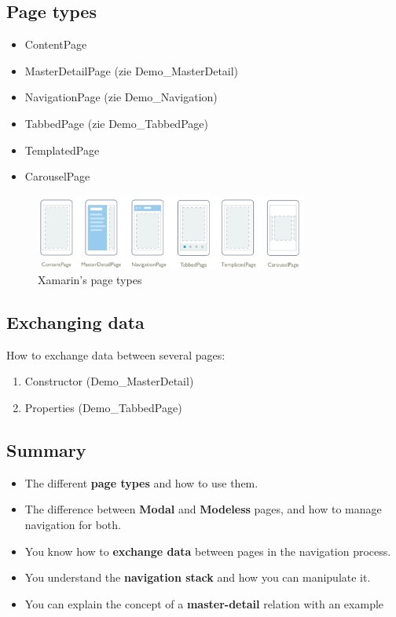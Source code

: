 \documentclass{article}
\newcommand{\bold}[1]{\textbf{#1}}
\begin{document}
\subsection{Page types}

\begin{itemize}
    \item ContentPage
    \item MasterDetailPage (zie Demo\_MasterDetail)
    \item NavigationPage (zie Demo\_Navigation)
    \item TabbedPage (zie Demo\_TabbedPage)
    \item TemplatedPage
    \item CarouselPage 
\end{itemize}

\begin{figure}[H]
    \centering
    \includegraphics[width=0.8\textwidth]{pagetypes.png}
    \caption{Xamarin's page types}
\end{figure}

\subsection{Exchanging data}

How to exchange data between several pages:

\begin{enumerate}
    \item Constructor (Demo\_MasterDetail)
    \item Properties (Demo\_TabbedPage)
\end{enumerate}

\subsection{Summary}

\begin{itemize}
    \item The different \bold{page types} and how to use them.
    \item The difference between \bold{Modal} and \bold{Modeless} pages, and how to manage navigation for both.
    \item You know how to \bold{exchange data} between pages in the navigation process.
    \item You understand the \bold{navigation stack} and how you can manipulate it.
    \item You can explain the concept of a \bold{master-detail} relation with an example
\end{itemize}
\end{document}
